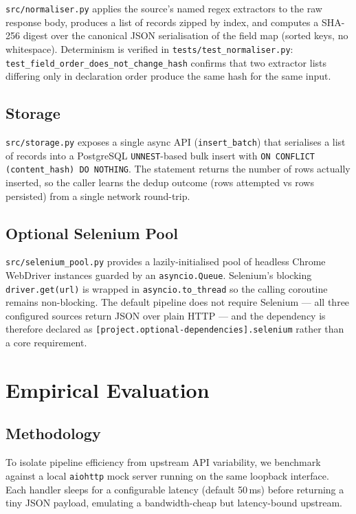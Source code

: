 \documentclass[conference]{IEEEtran}
\begin{document}
\texttt{src/normaliser.py} applies the source's named regex
extractors to the raw response body, produces a list of records
zipped by index, and computes a SHA-256 digest over the canonical
JSON serialisation of the field map (sorted keys, no whitespace).
Determinism is verified in
\texttt{tests/test\_normaliser.py}:
\texttt{test\_field\_order\_does\_not\_change\_hash} confirms that
two extractor lists differing only in declaration order produce
the same hash for the same input.

\subsection{Storage}

\texttt{src/storage.py} exposes a single async API
(\texttt{insert\_batch}) that serialises a list of records into a
PostgreSQL \texttt{UNNEST}-based bulk insert with
\texttt{ON CONFLICT (content\_hash) DO NOTHING}. The statement
returns the number of rows actually inserted, so the caller learns
the dedup outcome (rows attempted vs rows persisted) from a single
network round-trip.

\subsection{Optional Selenium Pool}

\texttt{src/selenium\_pool.py} provides a lazily-initialised pool
of headless Chrome WebDriver instances guarded by an
\texttt{asyncio.Queue}. Selenium's blocking
\texttt{driver.get(url)} is wrapped in
\texttt{asyncio.to\_thread} so the calling coroutine remains
non-blocking. The default pipeline does not require Selenium ---
all three configured sources return JSON over plain HTTP --- and
the dependency is therefore declared as
\texttt{[project.optional-dependencies].selenium} rather than a
core requirement.

\section{Empirical Evaluation}
\label{sec:eval}

\subsection{Methodology}

To isolate pipeline efficiency from upstream API variability, we
benchmark against a local \texttt{aiohttp} mock server running on
the same loopback interface. Each handler sleeps for a configurable
latency (default 50\,ms) before returning a tiny JSON payload,
emulating a bandwidth-cheap but latency-bound upstream.
\end{document}
